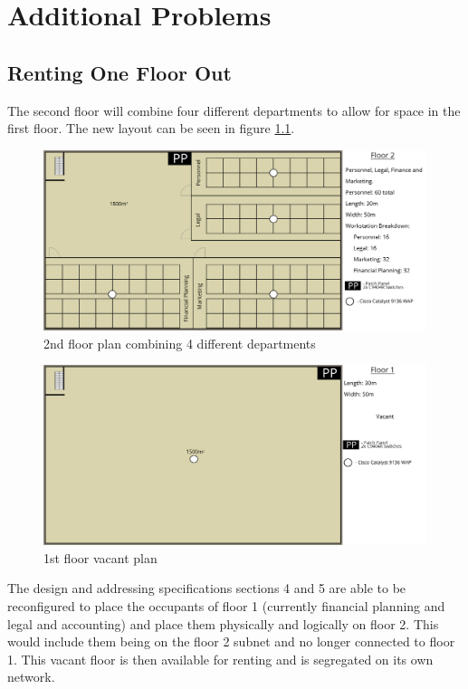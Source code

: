 \chapter{Additional Problems}

\section{Renting One Floor Out}

The second floor will combine four different departments to allow for space in the first floor. The new layout can be seen in figure \ref{fig:2nd_floor_varient}.
\begin{figure}[!h]
    \includegraphics[width=15cm]{Figures/2nd-Floor-Varient.png}
    \caption{2nd floor plan combining 4 different departments}
    \label{fig:2nd_floor_varient}
\end{figure}

\begin{figure}[h]
    \includegraphics[width=15cm]{Figures/1st-Floor-varient.png}
    \caption{1st floor vacant plan}
    \label{fig:1st_floor_empty}
\end{figure}

The design and addressing specifications sections 4 and 5 are able to be reconfigured to place the occupants of floor 1 (currently financial planning and legal and accounting) and place them physically and logically on floor 2. This would include them being on the floor 2 subnet and no longer connected to floor 1. This vacant floor is then available for renting and is segregated on its own network.

